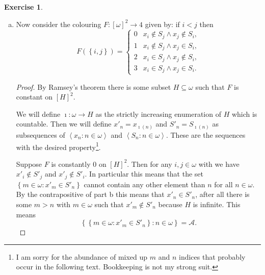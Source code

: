 \documentclass{article}
\theoremstyle{definition}
\newtheorem{question}{Exercise}
\newcommand{\set}[1]{\left\{#1\right\}}
\newcommand{\setwith}[2]{\set{#1\colon#2}}
\newcommand{\sequence}[2]{\left<#1:#2\right>}
\begin{document}
\begin{question}
\begin{enumerate}[a.]
        \item Now consider the colouring \(F:[\omega]^{2}\to4\) given by: if
              \(i<j\) then
              \[
                  F(\set{i,j})=\begin{cases}
                      0 & x_{i}\notin S_{j}\wedge x_{j}\notin S_{i}, \\
                      1 & x_{i}\notin S_{j}\wedge x_{j}\in S_{i},    \\
                      2 & x_{i}\in S_{j}\wedge x_{j}\notin S_{i},    \\
                      3 & x_{i}\in S_{j}\wedge x_{j}\in S_{i}.
                  \end{cases}
              \]

              \begin{proof}
                  By Ramsey's theorem there is some subset \(H\subseteq\omega\)
                  such that \(F\) is constant on \([H]^{2}\).

                  We will define \(\imath:\omega\to H\) as the strictly
                  increasing enumeration of \(H\) which is countable. Then we
                  will define \(x'_{n}=x_{\imath(n)}\) and
                  \(S'_{n}=S_{\imath(n)}\) as subsequences of
                  \(\sequence{x_{n}}{n\in\omega}\) and
                  \(\sequence{S_{n}}{n\in\omega}\). These are the sequences with
                  the desired property\footnote{I am sorry for the abundance of
                      mixed up \(m\) and \(n\) indices that probably occur in the
                      following text. Bookkeeping is not my strong suit.}.

                  Suppose \(F\) is constantly \(0\) on \([H]^{2}\). Then for any
                  \(i,j\in \omega\) with we have \(x'_{i}\notin S'_{j}\) and
                  \(x'_{j}\notin S'_{i}\). In particular this means that the set
                  \(\setwith{m\in \omega}{x'_{m}\in S'_{n}}\) cannot contain any
                  other element than \(n\) for all \(n\in \omega\). By the
                  contrapositive of part b this means that \(x'_{n}\in S'_{n}\),
                  after all there is some \(m>n\) with \(m\in \omega\) such that
                  \(x'_{m}\notin S'_{n}\) because \(H\) is infinite. This means
                  \[
                      \setwith{\setwith{m\in\omega}{x'_{m}\in S'_{n}}}{n\in\omega}=\mathcal{A}.
                  \]


\end{proof}
\end{enumerate}
\end{question}
\end{document}
